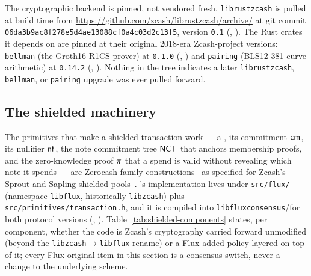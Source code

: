 The cryptographic backend is pinned, not vendored fresh. \texttt{librustzcash} is pulled at build time
from \url{https://github.com/zcash/librustzcash/archive/} at git commit
\texttt{06da3b9ac8f278e5\allowbreak{}d4ae13088cf0a4c0\allowbreak{}3d2c13f5}, version \texttt{0.1} (\shipped,
). The Rust crates it depends on are pinned at
their original 2018-era Zcash-project versions: \texttt{bellman} (the Groth16 R1CS prover) at
\texttt{0.1.0} (\shipped, ) and \texttt{pairing}
(BLS12-381 curve arithmetic) at \texttt{0.14.2} (\shipped,
). Nothing in the tree indicates a later
\texttt{librustzcash}, \texttt{bellman}, or \texttt{pairing} upgrade was ever pulled forward.

\subsection{The shielded machinery}
\label{sec:shielded-machinery}

The primitives that make a shielded transaction work — a \note, its commitment $\mathsf{cm}$, its nullifier
$\mathsf{nf}$, the note commitment tree $\mathsf{NCT}$ that anchors membership proofs, and the zero-knowledge proof
$\pi$ that a spend is valid without revealing which note it spends — are Zerocash-family
constructions~\citep{bensasson2014zerocash} as specified for Zcash's Sprout and Sapling shielded
pools~\citep{zcashprotocol}. \fluxd's implementation lives under \texttt{src/flux/} (namespace
\texttt{libflux}, historically \texttt{libzcash}) plus \texttt{src/\allowbreak{}primitives/\allowbreak{}transaction.\allowbreak{}h}, and it
is compiled into \texttt{libfluxconsensus}/\fluxd for both protocol versions
(\shipped, ). Table~\ref{tab:shielded-components}
states, per component, whether the code is Zcash's cryptography carried forward unmodified (beyond the
\texttt{libzcash}$\to$\texttt{libflux} rename) or a Flux-added policy layered on top of it; every
Flux-original item in this section is a consensus switch, never a change to the underlying scheme.

